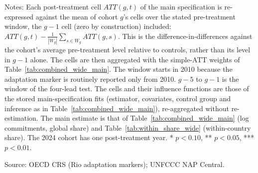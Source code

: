 \begin{table}[H]
\centering
\caption{Simple ATT against each cohort's pre-period mean instead of its $g-1$ base year}
\label{tab:premean_baseline}
\par\vspace{4pt}
\begin{minipage}{\linewidth}\footnotesize
Notes: Each post-treatment cell $ATT(g,t)$ of the main specification is re-expressed against the mean of cohort $g$'s cells over the stated pre-treatment window, the $g-1$ cell (zero by construction) included: $ATT(g,t) - \frac{1}{|W_g|}\sum_{s \in W_g} ATT(g,s)$. This is the difference-in-differences against the cohort's average pre-treatment level relative to controls, rather than its level in $g-1$ alone. The cells are then aggregated with the simple-ATT weights of Table~\ref{tab:combined_wide_main}. The window starts in 2010 because the adaptation marker is routinely reported only from 2010. $g-5$ to $g-1$ is the window of the four-lead test. The cells and their influence functions are those of the stored main-specification fits (estimator, covariates, control group and inference as in Table~\ref{tab:combined_wide_main}), re-aggregated without re-estimation. The main estimate is that of Table~\ref{tab:combined_wide_main} (log commitments, global share) and Table~\ref{tab:within_share_wide} (within-country share). The 2024 cohort has one post-treatment year. * $p<0.10$, ** $p<0.05$, *** $p<0.01$.\par
Source: OECD CRS (Rio adaptation markers); UNFCCC NAP Central.
\end{minipage}
\end{table}
